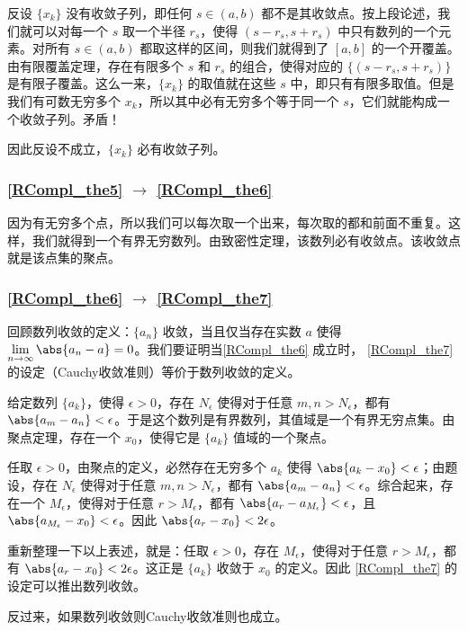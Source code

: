 反设 $\{x_k\}$ 没有收敛子列，即任何 $s\in(a, b)$ 都不是其收敛点。按上段论述，我们就可以对每一个 $s$ 取一个半径 $r_s$，使得 $(s-r_s, s+r_s)$ 中只有数列的一个元素。对所有 $s\in(a, b)$ 都取这样的区间，则我们就得到了 $[a, b]$ 的一个开覆盖。由有限覆盖定理，存在有限多个 $s$ 和 $r_s$ 的组合，使得对应的 $\{(s-r_s, s+r_s)\}$ 是有限子覆盖。这么一来，$\{x_k\}$ 的取值就在这些 $s$ 中，即只有有限多取值。但是我们有可数无穷多个 $x_k$，所以其中必有无穷多个等于同一个 $s$，它们就能构成一个收敛子列。矛盾！

因此反设不成立，$\{x_k\}$ 必有收敛子列。

\subsubsection{\autoref{RCompl_the5} $\to$ \autoref{RCompl_the6} }

因为有无穷多个点，所以我们可以每次取一个出来，每次取的都和前面不重复。这样，我们就得到一个有界无穷数列。由致密性定理，该数列必有收敛点。该收敛点就是该点集的聚点。



\subsubsection{\autoref{RCompl_the6} $\to$ \autoref{RCompl_the7} }

回顾数列收敛的定义：$\{a_n\}$ 收敛，当且仅当存在实数 $a$ 使得 $\lim\limits_{n\to \infty}\abs{a_n-a}=0$。我们要证明当\autoref{RCompl_the6} 成立时， \autoref{RCompl_the7} 的设定（Cauchy收敛准则）等价于数列收敛的定义。

给定数列 $\{a_k\}$，使得 $\epsilon>0$，存在 $N_\epsilon$ 使得对于任意 $m, n>N_\epsilon$，都有 $\abs{a_m-a_n}<\epsilon$。于是这个数列是有界数列，其值域是一个有界无穷点集。由聚点定理，存在一个 $x_0$，使得它是 $\{a_k\}$ 值域的一个聚点。

任取 $\epsilon>0$，由聚点的定义，必然存在无穷多个 $a_k$ 使得 $\abs{a_k-x_0}<\epsilon$；由题设，存在 $N_\epsilon$ 使得对于任意 $m, n>N_\epsilon$，都有 $\abs{a_m-a_n}<\epsilon$。综合起来，存在一个 $M_\epsilon$，使得对于任意 $r>M_\epsilon$，都有 $\abs{a_r-a_{M_\epsilon}}<\epsilon$，且 $\abs{a_{M_\epsilon}-x_0}<\epsilon$。因此 $\abs{a_r-x_0}<2\epsilon$。

重新整理一下以上表述，就是：任取 $\epsilon>0$，存在 $M_\epsilon$，使得对于任意 $r>M_\epsilon$，都有 $\abs{a_r-x_0}<2\epsilon$。这正是 $\{a_k\}$ 收敛于 $x_0$ 的定义。因此 \autoref{RCompl_the7} 的设定可以推出数列收敛。

反过来，如果数列收敛则Cauchy收敛准则也成立。


